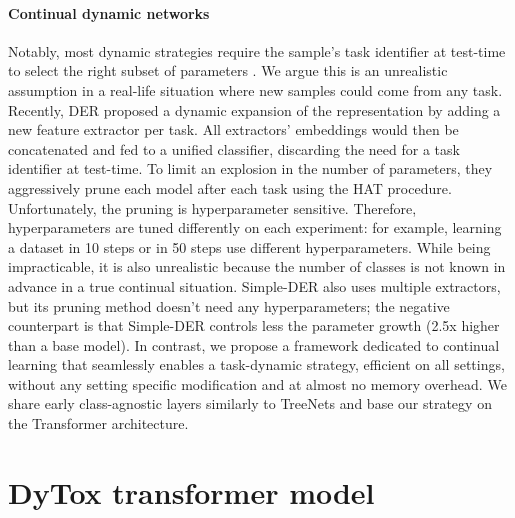 \paragraph{Continual dynamic networks}  Notably, most dynamic strategies require the sample's task
identifier at test-time to select the right subset of parameters
\citep{fernando2017path_net,golkar2019neural_pruning}. We argue this is an unrealistic assumption in
a real-life situation where new samples could come from any task. Recently, DER \citep{yan2021der}
proposed a dynamic expansion of the representation by adding a new feature extractor per task. All
extractors' embeddings would then be concatenated and fed to a unified classifier, discarding the
need for a task identifier at test-time. To limit an explosion in the number of parameters, they
aggressively prune each model after each task using the HAT \citep{serra2018hat} procedure.
Unfortunately, the pruning is hyperparameter sensitive. Therefore, hyperparameters are tuned
differently on each experiment: for example, learning a dataset in 10 steps or in 50 steps use
different hyperparameters. While being impracticable, it is also unrealistic because the number of
classes is not known in advance in a true continual situation. Simple-DER \citep{li2021preserve}
also uses multiple extractors, but its pruning method doesn't need any hyperparameters; the negative
counterpart is that Simple-DER controls less the parameter growth (2.5x higher than a base model).
In contrast, we propose a framework dedicated to continual learning that seamlessly enables a
task-dynamic strategy, efficient on all settings, without any setting specific modification and at
almost no memory overhead. We share early class-agnostic \citep{olah2017feature} layers similarly to
TreeNets \citep{lee2015treenet} and base our strategy on the Transformer architecture.


\section{DyTox transformer model}
\label{sec:dytox_model}

